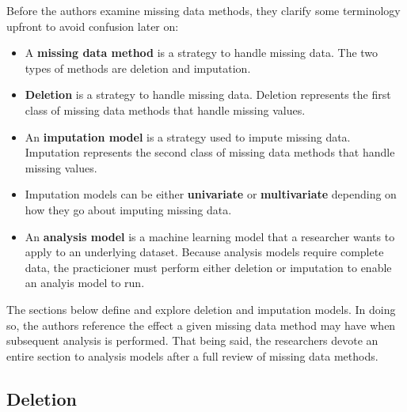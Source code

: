\documentclass[12pt,oneside]{chicagocapstone}
\providecommand{\tightlist}{%
  \setlength{\itemsep}{0pt}\setlength{\parskip}{0pt}}
\begin{document}
Before the authors examine missing data methods, they clarify some
terminology upfront to avoid confusion later on:
\begin{itemize}
\tightlist
\item
  A \textbf{missing data method} is a strategy to handle missing data.
  The two types of methods are deletion and imputation.
\item
  \textbf{Deletion} is a strategy to handle missing data. Deletion
  represents the first class of missing data methods that handle missing
  values.
\item
  An \textbf{imputation model} is a strategy used to impute missing
  data. Imputation represents the second class of missing data methods
  that handle missing values.
\item
  Imputation models can be either \textbf{univariate} or
  \textbf{multivariate} depending on how they go about imputing missing
  data.
\item
  An \textbf{analysis model} is a machine learning model that a
  researcher wants to apply to an underlying dataset. Because analysis
  models require complete data, the practicioner must perform either
  deletion or imputation to enable an analyis model to run.
\end{itemize}
The sections below define and explore deletion and imputation models. In
doing so, the authors reference the effect a given missing data method
may have when subsequent analysis is performed. That being said, the
researchers devote an entire section to analysis models after a full
review of missing data methods.

\hypertarget{background-deletion}{\subsection*{Deletion}\label{background-deletion}}
\end{document}
